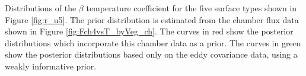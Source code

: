 \label{fig:Beta_T_Fch4_U5S01_withPrior_Stor} Distributions of
the \(\beta\) temperature coefficient for the five surface types shown
in Figure \ref{fig:r_u5}. The prior distribution is estimated from the
chamber flux data shown in Figure \ref{fig:Fch4vsT_byVeg_ch}. The curves
in red show the posterior distributions which incorporate this chamber
data as a prior. The curves in green show the posterior distributions
based only on the eddy covariance data, using a weakly informative
prior.